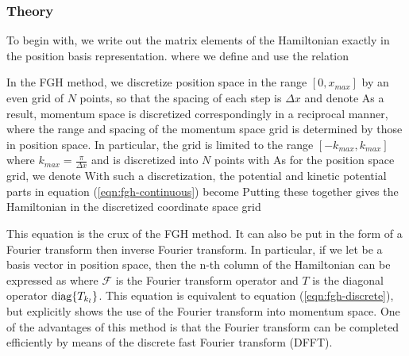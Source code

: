 \documentclass[%
 reprint,
 amsmath,amssymb,
 aps,
 nofootinbib
]{revtex4-1}
\begin{document}
\subsubsection{\label{sec:FGH-theory}Theory}

To begin with, we write out the matrix elements of the Hamiltonian exactly in the position basis representation.
where we define
and use
 the relation

In the FGH method, we discretize position space in the range $[0,x_{max}]$ by an even grid of $N$ points, so that the spacing of each step is $\Delta x$ and denote
As a result, momentum space is discretized correspondingly in a reciprocal manner, where the range and spacing of the momentum space grid is determined by those in position space. In particular, the grid is limited to the range $[-k_{max},k_{max}]$ where $k_{max} = \frac{\pi}{\Delta x}$ and is discretized into $N$ points with 
As for the position space grid, we denote
With such a discretization, the potential and kinetic potential parts in equation (\ref{eqn:fgh-continuous}) become
Putting these together gives the Hamiltonian in the discretized coordinate space grid

This equation is the crux of the FGH method. It can also be put in the form of a Fourier transform then inverse Fourier transform. In particular, if we let
be a basis vector in position space, then the n-th column of the Hamiltonian can be expressed as
where $\mathcal{F}$ is the Fourier transform operator and $T$ is the diagonal operator $\text{diag}\{T_{k_l}\}$. This equation is equivalent to equation (\ref{eqn:fgh-discrete}), but explicitly shows the use of the Fourier transform into momentum space. One of the advantages of this method is that the Fourier transform can be completed efficiently by means of the discrete fast Fourier transform (DFFT).
\end{document}
